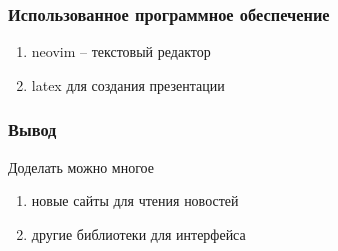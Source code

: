 \documentclass[aspectratio=169,12pt]{beamer}
\begin{document}
\begin{frame}
    \frametitle{Использованное программное обеспечение}
    \begin{enumerate}
        \item neovim -- текстовый редактор
        \item latex для создания презентации
    \end{enumerate}
\end{frame}
\begin{frame}
    \frametitle{Вывод}
    Доделать можно многое
    \begin{enumerate}
        \item новые сайты для чтения новостей
        \item другие библиотеки для интерфейса
    \end{enumerate}
\end{frame}
\end{document}
